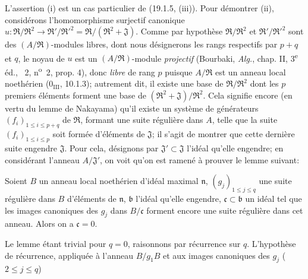 L'assertion (i) est un cas particulier de (19.1.5, (iii)). Pour démontrer (ii), considérons l'homomorphisme surjectif canonique $u:\mathfrak R/\mathfrak R^2\to\mathfrak R'/\mathfrak R'^2=\mathfrak R/(\mathfrak R^2+\mathfrak J)$. Comme par hypothèse $\mathfrak R/\mathfrak R^2$ et $\mathfrak R'/\mathfrak R'^2$ sont des $(A/\mathfrak R)$-modules libres, dont nous désignerons les rangs respectifs par $p+q$ et $q$, le noyau de $u$ est un $(A/\mathfrak R)$-module \emph{projectif} (Bourbaki, \emph{Alg.}, chap. II, 3\textsuperscript{e} éd., \textsection~2, n\textsuperscript{o}~2, prop. 4), donc \emph{libre} de rang $p$ puisque $A/\mathfrak R$ est un anneau local noethérien ($0_{\mathrm{III}}$, 10.1.3); autrement dit, il existe une base de $\mathfrak R/\mathfrak R^2$ dont les $p$ premiers éléments forment une base de $(\mathfrak R^2+\mathfrak J)/\mathfrak R^2$. Cela signifie encore (en vertu du lemme de Nakayama) qu'il existe un système de générateurs $(f_i)_{1\leq i\leq p+q}$ de $\mathfrak R$, formant une suite régulière dans $A$, telle que la suite $(f_i)_{1\leq i\leq p}$ soit formée d'éléments de $\mathfrak J$; il s'agit de montrer que cette dernière suite engendre $\mathfrak J$. Pour cela, désignons par $\mathfrak J'\subset\mathfrak J$ l'idéal qu'elle engendre; en considérant l'anneau $A/\mathfrak J'$, on voit qu'on est ramené à prouver le lemme suivant:

\begin{lemma}[19.1.6.1]
\label{IV.19.1.6.1}
Soient $B$ un anneau local noethérien d'idéal maximal $\mathfrak n$, $(g_j)_{1\leq j\leq q}$ une suite régulière dans $B$ d'éléments de $\mathfrak n$, $\mathfrak b$ l'idéal qu'elle engendre, $\mathfrak c\subset\mathfrak b$ un idéal tel que les images canoniques des $g_j$ dans $B/\mathfrak c$ forment encore une suite régulière dans cet anneau. Alors on a $\mathfrak c=0$.
\end{lemma}

Le lemme étant trivial pour $q=0$, raisonnons par récurrence sur $q$. L'hypothèse de récurrence, appliquée à l'anneau $B/g_1B$ et aux images canoniques des $g_j$ ($2\leq j\leq q$)

